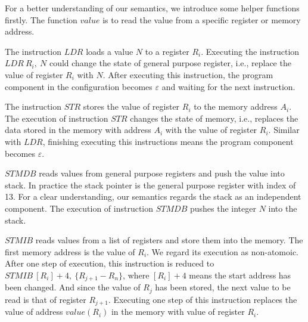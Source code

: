 \documentclass[letterpaper, 10 pt, conference]{IEEEtran}
\begin{document}
For a better understanding of our semantics, we introduce some helper functions firstly. The function $value$ is to read the value from a specific register or memory address.
\par The instruction $LDR$ loads a value $N$ to a register $R_i$. Executing the instruction $LDR~R_i,~N$ could change the state of general purpose register, i.e., replace the value of register $R_i$ with $N$. After executing this instruction, the program component in the configuration becomes $\varepsilon$ and waiting for the next instruction.
 \par The instruction $STR$ stores the value of register $R_i$ to the memory address $A_i$. The execution of instruction $STR$ changes the state of memory, i.e., replaces the data stored in the memory with address $A_i$ with the value of register $R_i$. Similar with $LDR$, finishing executing this instructions means the program component becomes $\varepsilon$.
\par $STMDB$ reads values from general purpose registers and push the value into stack. In practice the stack pointer is the general purpose register with index of 13. For a clear understanding, our semantics regards the stack as an independent component. The execution of instruction $STMDB$ pushes the integer $N$ into the stack.
\par $STMIB$ reads values from a list of registers and store them into the memory. The first memory address is the value of $R_i$.  We regard its execution as non-atomoic. After one step of execution, this instruction is reduced to $STMIB~[R_i]+4,~\{R_{j+1}-R_n\}$, where $[R_i]+4$ means the start address has been changed. And since the value of $R_j$ has been stored, the next value to be read is that of register $R_{j+1}$. Executing one step of this instruction replaces the value of address $value(R_i)$ in the memory with value of register $R_i$.
\end{document}

